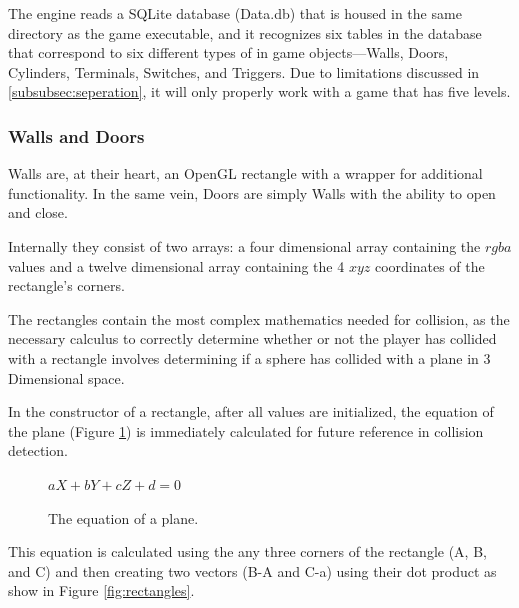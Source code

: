 \documentclass{article}
\begin{document}
The engine reads a SQLite database (Data.db) that is housed in the same directory as the game executable, and it recognizes six tables in the database that correspond to six different types of in game objects---Walls, Doors, Cylinders, Terminals, Switches, and Triggers. Due to limitations discussed in \ref{subsubsec:seperation}, it will only properly work with a game that has five levels.

\subsubsection{Walls and Doors} \label{subsubsec:walls}

Walls are, at their heart, an OpenGL rectangle with a wrapper for additional functionality. In the same vein, Doors are simply Walls with the ability to open and close.

Internally they consist of two arrays: a four dimensional array containing the $rgba$ values and a twelve dimensional array containing the 4 $xyz$ coordinates of the rectangle's corners. 

The rectangles contain the most complex mathematics needed for collision, as the necessary calculus to correctly determine whether or not the player has collided with a rectangle involves determining if a sphere has collided with a plane in 3 Dimensional space.

In the constructor of a rectangle, after all values are initialized, the equation of the plane (Figure \ref{fig:plane}) is immediately calculated for future reference in collision detection.

\begin{figure}[H]
	$aX + bY + cZ + d = 0$
	\caption{The equation of a plane.}
	\label{fig:plane}
\end{figure}

This equation is calculated using the any three corners of the rectangle (A, B, and C) and then creating two vectors (B-A and C-a) using their dot product as show in Figure \ref{fig:rectangles}.
\end{document}
